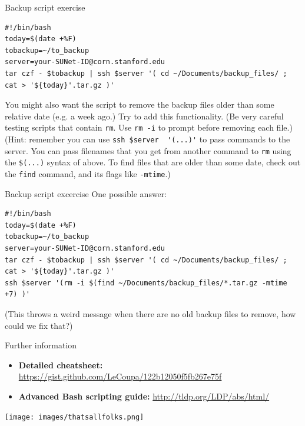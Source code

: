 \documentclass{beamer}
\begin{document}
\begin{frame}[fragile]{Backup script exercise}
\begin{lstlisting}
#!/bin/bash
today=$(date +%F)
tobackup=~/to_backup
server=your-SUNet-ID@corn.stanford.edu
tar czf - $tobackup | ssh $server '( cd ~/Documents/backup_files/ ; cat > '${today}'.tar.gz )'
\end{lstlisting}
You might also want the script to remove the backup files older than some relative date (e.g. a week ago.) Try to add this functionality. \alert{(Be very careful testing scripts that contain \lstinline|rm|. Use \lstinline|rm -i| to prompt before removing each file.)} (Hint: remember you can use \lstinline|ssh $server  '(...)'| to pass commands to the server. You can pass filenames that you get from another command to \lstinline|rm| using the \lstinline|$(...)| syntax of above. To find files that are older than some date, check out the \lstinline|find| command, and its flags like \lstinline|-mtime|.)
\end{frame}

\begin{frame}[fragile]{Backup script excercise}
One possible answer:
\begin{lstlisting}[title=backup.sh]
#!/bin/bash
today=$(date +%F)
tobackup=~/to_backup
server=your-SUNet-ID@corn.stanford.edu
tar czf - $tobackup | ssh $server '( cd ~/Documents/backup_files/ ; cat > '${today}'.tar.gz )'
ssh $server '(rm -i $(find ~/Documents/backup_files/*.tar.gz -mtime +7) )'
\end{lstlisting}
(This throws a weird message when there are no old backup files to remove, how could we fix that?)
\end{frame}

\begin{frame}{Further information}
\begin{itemize}
\item \textbf{Detailed cheatsheet:} {\color{blue} \url{https://gist.github.com/LeCoupa/122b12050f5fb267e75f}}
\item \textbf{Advanced Bash scripting guide:}  {\color{blue} \url{http://tldp.org/LDP/abs/html/}}
\end{itemize}
\begin{center}
\texttt{[image: images/thatsallfolks.png]}
\end{center}
\end{frame}
\end{document}
